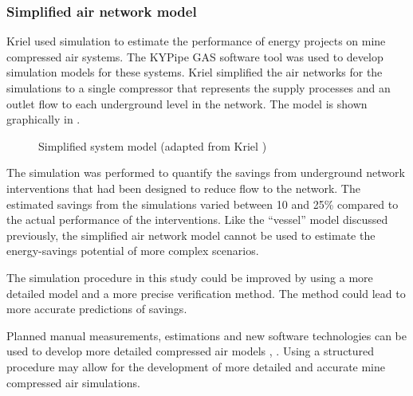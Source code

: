 		\subsubsection{Simplified air network model}
		Kriel \cite{Kriel2014Masters} used simulation to estimate the performance of energy projects on mine compressed air systems. The KYPipe GAS software tool was used to develop simulation models for these systems. Kriel simplified the air networks for the simulations to a single compressor that represents the supply processes and an outlet flow to each underground level in the network. The model is shown graphically in .
		\begin{figure}[h!]
			\centering
			\caption[Simplified system model]{Simplified system model (adapted from Kriel \cite{Kriel2014Masters})}
			\label{fig:kriel model}
		\end{figure}
		\par 
		The simulation was performed to quantify the savings from underground network interventions that had been designed to reduce flow to the network. The estimated savings from the simulations varied between 10 and 25\% compared to the actual performance of the interventions. Like the \enquote{vessel} model discussed previously, the simplified air network model cannot be used to estimate the energy-savings potential of more complex scenarios.
		\par 
		 The simulation procedure in this study could be improved by using a more detailed model and a more precise verification method. The method could lead to more accurate predictions of savings. 
		\par
		Planned manual measurements, estimations and new software technologies can be used to develop more detailed compressed air models \cite{Bredenkamp2015Challeges}, \cite{Mare2017Evaluating}. Using a structured procedure may allow for the development of more detailed and accurate mine compressed air simulations.
		
